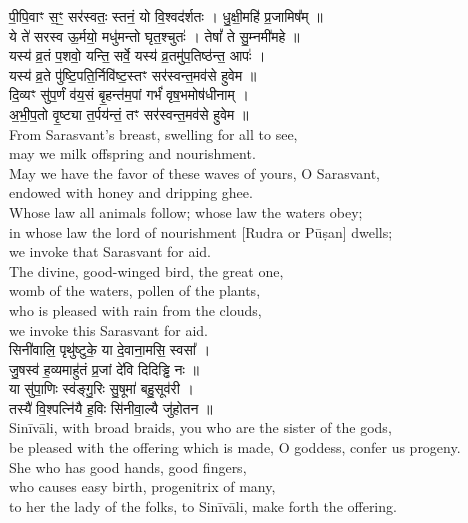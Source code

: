 \documentclass[11pt]{article}
\begin{document}
\begin{adjustwidth}{6em}{.2em}
{\large\skts\color{deepblue}
पी॒पि॒वाꣳ स॒ꣳ॒ सर॑स्वतः॒ स्तनं॒ यो वि॒श्वद॑र्शतः । धु॒क्षी॒महि॑ प्र॒जामिष᳚म् ॥\\
ये ते॑ सरस्व ऊ॒र्मयो॒ मधु॑मन्तो घृत॒श्चुतः॑ । तेषां᳚ ते सु॒म्नमी॑महे ॥\\ 
यस्य॑ व्र॒तं प॒शवो॒ यन्ति॒ सर्वे॒ यस्य॑ व्र॒तमु॑प॒तिष्ठ॑न्त॒ आपः॑ ।\\ 
यस्य॑ व्र॒ते पु॑ष्टि॒पति॒र्निवि॑ष्ट॒स्तꣳ सर॑स्वन्त॒मव॑से हुवेम ॥\\
दि॒व्यꣳ सु॑प॒र्णं व॑य॒सं बृ॒हन्त॑म॒पां गर्भं॑ वृष॒भमोष॑धीनाम् ।\\
अ॒भी॒प॒तो वृ॒ष्ट्या त॒र्पय॑न्तं॒ तꣳ सर॑स्वन्त॒मव॑से हुवेम ॥}\\[5pt] 
From Sarasvant's breast, swelling for all to see,\\
may we milk offspring and nourishment.\\
May we have the favor of these waves of yours, O Sarasvant,\\ 
endowed with honey and dripping ghee.\\
Whose law all animals follow; whose law the waters obey;\\
in whose law the lord of nourishment [Rudra or Pūṣan] dwells;\\
we invoke that Sarasvant for aid.\\
The divine, good-winged bird, the great one,\\
womb of the waters, pollen of the plants,\\
who is pleased with rain from the clouds,\\
we invoke this Sarasvant for aid.\\[10pt]

{\large\skts\color{deepblue}
सिनी॑वालि॒ पृथु॑ष्टुके॒ या दे॒वाना॒मसि॒ स्वसा᳚ ।\\
जु॒षस्व॑ ह॒व्यमाहु॑तं प्र॒जां दे॑वि दिदिड्ढि नः ॥\\
या सु॑पा॒णिः स्व॑ङ्गु॒रिः सु॒षूमा॑ बहु॒सूव॑री ।\\
तस्यै॑ वि॒श्पत्नि॑यै ह॒विः सि॑नीवा॒ल्यै जु॑होतन ॥}\\[5pt]
Sinīvāli, with broad braids, you who are the sister of the gods,\\
be pleased with the offering which is made, O goddess, confer us progeny.\\
She who has good hands, good fingers,\\ 
who causes easy birth, progenitrix of many,\\
to her the lady of the folks, to Sinīvāli, make forth the offering.\\
\end{adjustwidth}
\end{document}
